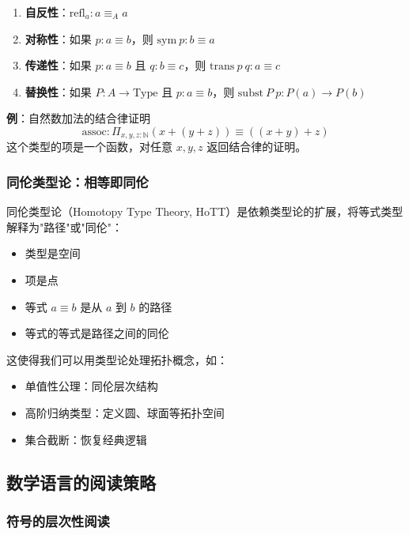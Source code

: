 \documentclass[12pt,a4paper,UTF8]{ctexart}
\begin{document}
\begin{enumerate}
    \item \textbf{自反性}：$\mathrm{refl}_a : a \equiv_A a$
    \item \textbf{对称性}：如果 $p : a \equiv b$，则 $\mathrm{sym}\ p : b \equiv a$
    \item \textbf{传递性}：如果 $p : a \equiv b$ 且 $q : b \equiv c$，则 $\mathrm{trans}\ p\ q : a \equiv c$
    \item \textbf{替换性}：如果 $P : A \to \mathrm{Type}$ 且 $p : a \equiv b$，则 $\mathrm{subst}\ P\ p : P(a) \to P(b)$
\end{enumerate}

\textbf{例}：自然数加法的结合律证明
$$\mathrm{assoc} : \Pi_{x,y,z:\mathbb{N}} (x + (y + z)) \equiv ((x + y) + z)$$
这个类型的项是一个函数，对任意 $x,y,z$ 返回结合律的证明。

\subsubsection{同伦类型论：相等即同伦}

同伦类型论（Homotopy Type Theory, HoTT）是依赖类型论的扩展，将等式类型解释为"路径"或"同伦"：

\begin{itemize}
    \item 类型是空间
    \item 项是点
    \item 等式 $a \equiv b$ 是从 $a$ 到 $b$ 的路径
    \item 等式的等式是路径之间的同伦
\end{itemize}

这使得我们可以用类型论处理拓扑概念，如：
\begin{itemize}
    \item 单值性公理：同伦层次结构
    \item 高阶归纳类型：定义圆、球面等拓扑空间
    \item 集合截断：恢复经典逻辑
\end{itemize}

\subsection{数学语言的阅读策略}

\subsubsection{符号的层次性阅读}
\end{document}
